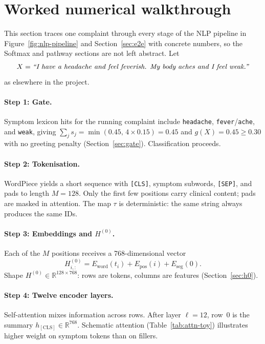 \section{Worked numerical walkthrough}
\label{sec:walkthrough}

This section traces one complaint through every stage of the NLP pipeline in Figure~\ref{fig:nlp-pipeline} and Section~\ref{sec:e2e} with concrete numbers, so the Softmax and pathway sections are not left abstract. Let
\[
  X = \text{\textit{``I have a headache and feel feverish. My body aches and I feel weak.''}{}}
\]
as elsewhere in the project.

\paragraph{Step 1: Gate.}
Symptom lexicon hits for the running complaint include \texttt{headache}, \texttt{fever}/\texttt{ache}, and \texttt{weak}, giving \(\sum_j s_j=\min(0.45,\,4\times 0.15)=0.45\) and \(g(X)=0.45\geq 0.30\) with no greeting penalty (Section~\ref{sec:gate}). Classification proceeds.

\paragraph{Step 2: Tokenisation.}
WordPiece yields a short sequence with \texttt{[CLS]}, symptom subwords, \texttt{[SEP]}, and pads to length \(M=128\). Only the first few positions carry clinical content; pads are masked in attention. The map \(\tau\) is deterministic: the same string always produces the same IDs.

\paragraph{Step 3: Embeddings and \(H^{(0)}\).}
Each of the \(M\) positions receives a 768-dimensional vector
\[
  H^{(0)}_{i,:} = E_{\mathrm{word}}(t_i) + E_{\mathrm{pos}}(i) + E_{\mathrm{seg}}(0).
\]
Shape \(H^{(0)}\in\mathbb{R}^{128\times 768}\): rows are tokens, columns are features (Section~\ref{sec:h0}).

\paragraph{Step 4: Twelve encoder layers.}
Self-attention mixes information across rows. After layer \(\ell=12\), row~0 is the summary \(h_{\mathrm{[CLS]}}\in\mathbb{R}^{768}\). Schematic attention (Table~\ref{tab:attn-toy}) illustrates higher weight on symptom tokens than on fillers.

